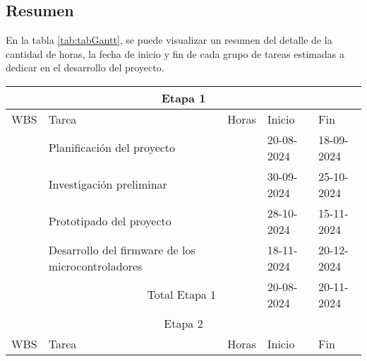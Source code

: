\subsection{Resumen}

En la tabla \ref{tab:tabGantt}, se puede visualizar un resumen del detalle de
la cantidad de horas, la fecha de inicio y fin de cada grupo de tareas
estimadas a dedicar en el desarrollo del proyecto.

\begin{table}[ht]
	\begin{tabularx}{\linewidth}{|p{0.8cm}|p{8.33cm}|p{1cm}|p{1.8cm}|p{1.8cm}|}
		\hline
		\multicolumn{5}{|c|}{Etapa 1}                                                                                                       \\ \hline
		\rowcolor[HTML]{C0C0C0}
		WBS                                 & Tarea                                             & Horas           & Inicio     & Fin        \\ \hline
		\centering{1}                       & Planificación del proyecto                        & \raggedleft{50} & 20-08-2024 & 18-09-2024 \\ \hline
		\centering{2}                       & Investigación preliminar                          & \raggedleft{80} & 30-09-2024 & 25-10-2024 \\ \hline
		\centering{3}                       & Prototipado del proyecto                          & \raggedleft{30} & 28-10-2024 & 15-11-2024 \\ \hline
		\centering{4}                       & Desarrollo del firmware de los microcontroladores & \raggedleft{67} & 18-11-2024 & 20-12-2024 \\ \hline
		\multicolumn{2}{|r|}{Total Etapa 1} & \raggedleft{227}                                  & 20-08-2024      & 20-11-2024              \\ \hline
		\multicolumn{5}{|c|}{Etapa 2}                                                                                                       \\ \hline
		\rowcolor[HTML]{C0C0C0}
		WBS                                 & Tarea                                             & Horas           & Inicio     & Fin        \\ \hline

\end{tabularx}
\end{table}

